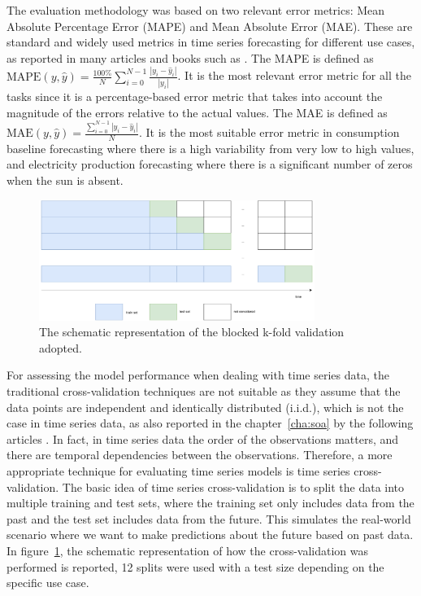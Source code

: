 The evaluation methodology was based on two relevant error metrics: Mean Absolute Percentage Error (MAPE) and Mean Absolute Error (MAE).
These are standard and widely used metrics in time series forecasting for different use cases, as reported in many articles and books such as \cite{armstrong2001principles, DEGOOIJER2006443, HYNDMAN2006679}.
The MAPE is defined as $\text{MAPE}(y, \hat{y}) = \frac{100\%}{N} \sum_{i=0}^{N - 1} \frac{|y_i - \hat{y}_i|}{|y_i|}$.
It is the most relevant error metric for all the tasks since it is a percentage-based error metric that takes into account the magnitude of the errors relative to the actual values.
The MAE is defined as $\text{MAE}(y, \hat{y}) = \frac{ \sum_{i=0}^{N - 1} |y_i - \hat{y}_i| }{N}$.
It is the most suitable error metric in consumption baseline forecasting where there is a high variability from very low to high values, and electricity production forecasting where there is a significant number of zeros when the sun is absent.

\begin{figure}[H]
\centering
\includegraphics[width=0.8\textwidth]{images/cross_validation}
\caption{The schematic representation of the blocked k-fold validation adopted.}
\label{fig:crossvalidation}
\end{figure}

For assessing the model performance when dealing with time series data, the traditional cross-validation techniques are not suitable as they assume that the data points are independent and identically distributed (i.i.d.), which is not the case in time series data, as also reported in the chapter~\ref{cha:soa} by the following articles \cite{BERGMEIR2012192, Cerqueira2020}.
In fact, in time series data the order of the observations matters, and there are temporal dependencies between the observations.
Therefore, a more appropriate technique for evaluating time series models is time series cross-validation.
The basic idea of time series cross-validation is to split the data into multiple training and test sets, where the training set only includes data from the past and the test set includes data from the future.
This simulates the real-world scenario where we want to make predictions about the future based on past data.
In figure~\ref{fig:crossvalidation}, the schematic representation of how the cross-validation was performed is reported, 12 splits were used with a test size depending on the specific use case.

